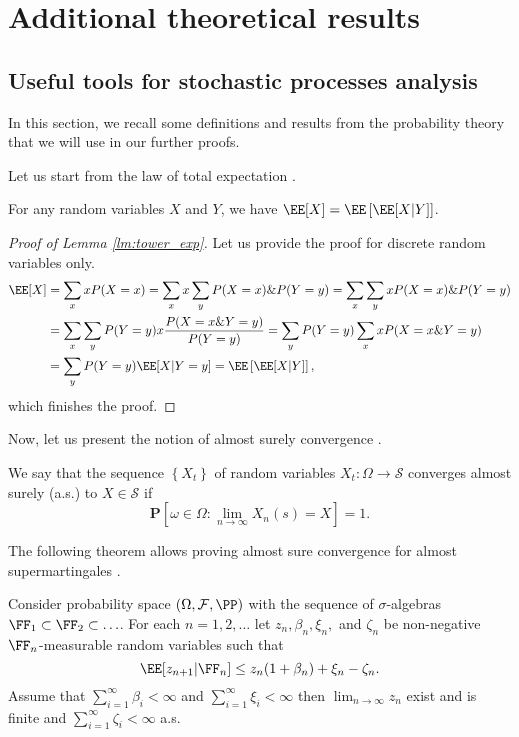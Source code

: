 \appendix
\chapter{Additional theoretical results}
\section{Useful tools for stochastic processes analysis}
In this section, we recall some definitions and results from the probability theory that we will use in our further proofs.

Let us start from the law of total expectation \cite[Chapter V, Section $4$]{kolmogorov1933grundbegriffe}.

\begin{lemma}\label{lm:tower_exp}
For any random variables $X$ and $Y$, we have $\EE[X] = \EE\left[\EE[X|Y]\right]$.
\end{lemma}
\begin{proof}[Proof of Lemma \ref{lm:tower_exp}]
    Let us provide the proof for discrete random variables only.
\begin{align}
\EE[X] &= \sum_x x P(X=x) = \sum_x x\sum_yP(X=x)\&P(Y=y) = \sum_x\sum_y x P(X=x)\&P(Y=y)\nonumber\\
&= \sum_x\sum_y P(Y=y)x\frac{P(X=x\&Y=y)}{P(Y = y)}  = \sum_y P(Y=y) \sum_x xP(X=x\&Y=y)\nonumber\\
& = \sum_y P(Y=y) \EE[X|Y=y] = \EE\left[\EE[X|Y]\right],
\end{align}
which finishes the proof.
\end{proof}

Now, let us present the notion of almost surely convergence \cite{stout1974almost}.
\begin{definition}
    We say that the sequence $\left\{X_t\right\}$ of random variables $X_t:\Omega\rightarrow \mathcal{S}$ converges almost surely (a.s.) to $X\in\mathcal{S}$ if 
    $$
    \mathbf{P}\left[\omega\in\Omega:\lim_{n\rightarrow\infty}X_n(s) = X\right] = 1.
    $$
\end{definition}

The following theorem allows proving almost sure convergence for almost supermartingales \cite[Theorem $1$]{robbins1971convergence}.
\begin{theorem}\label{th:r-s_theorem}
Consider probability space $(\Omega, \mathcal{F}, \PP)$ with the sequence of $\sigma$-algebras $\FF_1\subset\FF_2\subset\ldots$. For each $n = 1,2,\ldots$ let $z_n, \beta_n, \xi_n,$ and $\zeta_n$ be non-negative $\FF_n$-measurable random variables such that
\begin{equation}\label{eq:a-super-martingale}
\EE[z_{n+1}|\FF_n]\leq z_n(1+\beta_n) + \xi_n - \zeta_n.
\end{equation}
Assume that $\sum_{i=1}^\infty \beta_i<\infty$ and $\sum_{i=1}^\infty \xi_i<\infty$ then $\lim_{n\rightarrow\infty}z_n$ exist and is finite and $\sum_{i=1}^\infty \zeta_i<\infty$ a.s.
\end{theorem}

